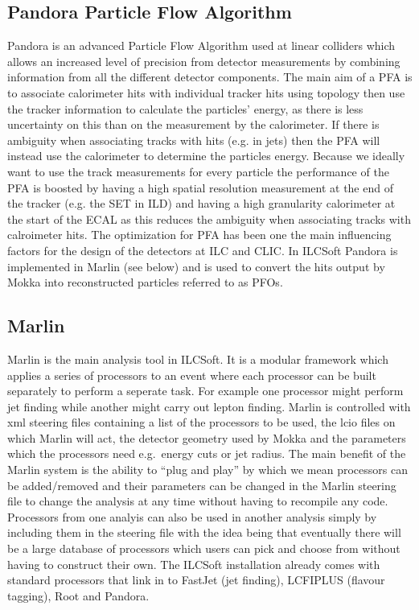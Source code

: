 \subsection{Pandora Particle Flow Algorithm}
\label{Pandora}
Pandora is an advanced Particle Flow Algorithm used at linear colliders which allows an increased level of precision from detector measurements by combining information from all the different detector components. The main aim of a \ac{PFA} is to associate calorimeter hits with individual tracker hits using topology then use the tracker information to calculate the particles' energy, as there is less uncertainty on this than on the measurement by the calorimeter. If there is ambiguity when associating tracks with hits (e.g. in jets) then the \ac{PFA} will instead use the calorimeter to determine the particles energy. Because we ideally want to use the track measurements for every particle the performance of the \ac{PFA} is boosted by having a high spatial resolution measurement at the end of the tracker (e.g. the \ac{SET} in \ac{ILD}) and having a high granularity calorimeter at the start of the \ac{ECAL} as this reduces the ambiguity when associating tracks with calroimeter hits. The optimization for \ac{PFA} has been one the main influencing factors for the design of the detectors at ILC and CLIC. In ILCSoft Pandora is implemented in Marlin (see below) and is used to convert the hits output by Mokka into reconstructed particles referred to as \ac{PFOs}.

\subsection{Marlin}
Marlin is the main analysis tool in ILCSoft. It is a modular framework which applies a series of processors to an event where each processor can be built separately to perform a seperate task. For example one processor might perform jet finding while another might carry out lepton finding. Marlin is controlled with xml steering files containing a list of the processors to be used, the lcio files on which Marlin will act, the detector geometry used by Mokka and the parameters which the processors need e.g.\ energy cuts or jet radius. The main benefit of the Marlin system is the ability to ``plug and play'' by which we mean processors can be added/removed and their parameters can be changed in the Marlin steering file to change the analysis at any time without having to recompile any code. Processors from one analyis can also be used in another analysis simply by including them in the steering file with the idea being that eventually there will be a large database of processors which users can pick and choose from without having to construct their own. The ILCSoft installation already comes with standard processors that link in to FastJet (jet finding), LCFIPLUS (flavour tagging), Root and Pandora.

